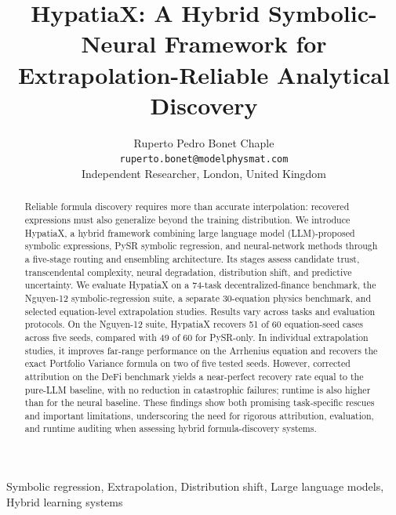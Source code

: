 \documentclass[twoside,11pt]{article}
\begin{document}
\raggedbottom


\title{HypatiaX: A Hybrid Symbolic-Neural Framework for
  Extrapolation-Reliable Analytical Discovery}

\author{Ruperto Pedro Bonet Chaple\\
  \texttt{ruperto.bonet@modelphysmat.com}\\
  Independent Researcher, London, United Kingdom
}


\maketitle


\begin{abstract}
Reliable formula discovery requires more than accurate interpolation: recovered expressions must also generalize beyond the training distribution. We introduce HypatiaX, a hybrid framework combining large language model (LLM)-proposed symbolic expressions, PySR symbolic regression, and neural-network methods through a five-stage routing and ensembling architecture. Its stages assess candidate trust, transcendental complexity, neural degradation, distribution shift, and predictive uncertainty.
We evaluate HypatiaX on a 74-task decentralized-finance benchmark, the Nguyen-12 symbolic-regression suite, a separate 30-equation physics benchmark, and selected equation-level extrapolation studies. Results vary across tasks and evaluation protocols. On the Nguyen-12 suite, HypatiaX recovers 51 of 60 equation-seed cases across five seeds, compared with 49 of 60 for PySR-only. In individual extrapolation studies, it improves far-range performance on the Arrhenius equation and recovers the exact Portfolio Variance formula on two of five tested seeds. However, corrected attribution on the DeFi benchmark yields a near-perfect recovery rate equal to the pure-LLM baseline, with no reduction in catastrophic failures; runtime is also higher than for the neural baseline. These findings show both promising task-specific rescues and important limitations, underscoring the need for rigorous attribution, evaluation, and runtime auditing when assessing hybrid formula-discovery systems.
\end{abstract}

\begin{keywords}
Symbolic regression, Extrapolation, Distribution shift, Large language models, Hybrid learning systems
\end{keywords}
\end{document}
